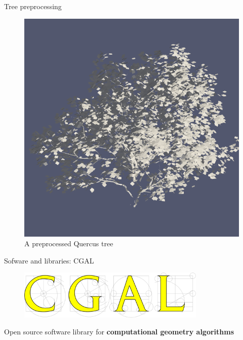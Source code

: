 \documentclass[10pt]{beamer}
\begin{document}
\begin{frame}{Tree preprocessing}
\begin{figure}[h]
\begin{minipage}{0.3\textwidth}
			\caption{A preprocessed Ginkgo tree}
			\label{fig:figure2}
		\end{minipage}
		\begin{minipage}{0.33\textwidth}
			\centering
			\includegraphics[width=\textwidth]{images/tree-quercus.png}
			\caption{A preprocessed Quercus tree}
			\label{fig:figure2}
		\end{minipage}
	\end{figure}
\end{frame}

\begin{frame}{Sofware and libraries: CGAL}
	\Large
	\begin{figure}[H]
		\centering
		\includegraphics[width=0.8\textwidth]{images/logo-cgal.png}
	\end{figure}
	\begin{center}
	  \Large Open source software library for \textbf{computational geometry algorithms}
	\end{center}
  \end{frame}
\end{document}
